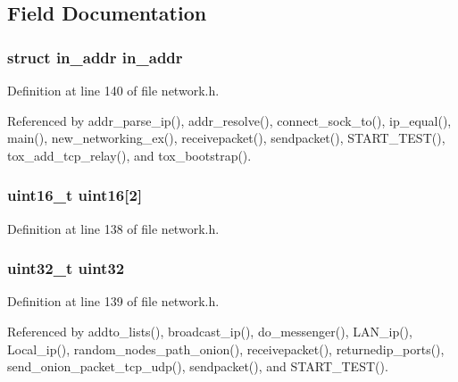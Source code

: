 \subsection{Field Documentation}
\hypertarget{union_i_p4_a5a47f63dce37e6eb6be40f022434b1c5}{
\subsubsection[{in\+\_\+addr}]{\setlength{\rightskip}{0pt plus 5cm}struct in\+\_\+addr in\+\_\+addr}}\label{union_i_p4_a5a47f63dce37e6eb6be40f022434b1c5}


Definition at line 140 of file network.\+h.



Referenced by addr\+\_\+parse\+\_\+ip(), addr\+\_\+resolve(), connect\+\_\+sock\+\_\+to(), ip\+\_\+equal(), main(), new\+\_\+networking\+\_\+ex(), receivepacket(), sendpacket(), S\+T\+A\+R\+T\+\_\+\+T\+E\+S\+T(), tox\+\_\+add\+\_\+tcp\+\_\+relay(), and tox\+\_\+bootstrap().

\hypertarget{union_i_p4_ac29b55876c4db8c2e69e138039fb7a8a}{
\subsubsection[{uint16}]{\setlength{\rightskip}{0pt plus 5cm}uint16\+\_\+t uint16\mbox{[}2\mbox{]}}}\label{union_i_p4_ac29b55876c4db8c2e69e138039fb7a8a}


Definition at line 138 of file network.\+h.

\hypertarget{union_i_p4_a5ad776be1fb768f3399aafcd1b58b3a2}{
\subsubsection[{uint32}]{\setlength{\rightskip}{0pt plus 5cm}uint32\+\_\+t uint32}}\label{union_i_p4_a5ad776be1fb768f3399aafcd1b58b3a2}


Definition at line 139 of file network.\+h.



Referenced by addto\+\_\+lists(), broadcast\+\_\+ip(), do\+\_\+messenger(), L\+A\+N\+\_\+ip(), Local\+\_\+ip(), random\+\_\+nodes\+\_\+path\+\_\+onion(), receivepacket(), returnedip\+\_\+ports(), send\+\_\+onion\+\_\+packet\+\_\+tcp\+\_\+udp(), sendpacket(), and S\+T\+A\+R\+T\+\_\+\+T\+E\+S\+T().

